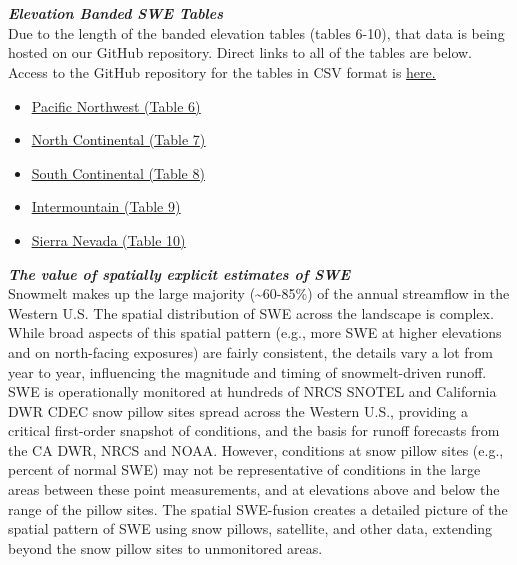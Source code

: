 \documentclass{article}
\begin{document}
\section*{}\label{sec:elev_band_swe}
\fontsize{12}{16}
\noindent\textbf{\textit{Elevation Banded SWE Tables}}\\
\fontsize{10}{14}
\noindent Due to the length of the banded elevation tables (tables 6-10), that data is being hosted on our GitHub repository. Direct links to all of the tables are below. Access to the GitHub repository for the tables in CSV format is \href{https://github.com/CU-Mountain-Hydrology/WestWide}{\underline{here.}}
\begin{itemize}
    \item \href{https://github.com/CU-Mountain-Hydrology/WestWide/blob/main/WY_2026/PNW_{{ date }}_table06.csv}{\underline{Pacific Northwest (Table 6)}}
    \item \href{https://github.com/CU-Mountain-Hydrology/WestWide/blob/main/WY_2026/NOCN_{{ date }}_table07.csv}{\underline{North Continental (Table 7)}}
    \item \href{https://github.com/CU-Mountain-Hydrology/WestWide/blob/main/WY_2026/SOCN_{{ date }}_table08.csv}{\underline{South Continental (Table 8)}}
    \item \href{https://github.com/CU-Mountain-Hydrology/WestWide/blob/main/WY_2026/INMT_{{ date }}_table09.csv}{\underline{Intermountain (Table 9)}}
    \item \href{https://github.com/CU-Mountain-Hydrology/WestWide/blob/main/WY_2026/SNM_{{ date }}_table10.csv}{\underline{Sierra Nevada (Table 10)}}
\end{itemize}

\fontsize{12}{16}
\noindent\textbf{\textit{The value of spatially explicit estimates of SWE}}\\
\fontsize{10}{14}
\noindent Snowmelt makes up the large majority (\textasciitilde60-85\%) of the annual streamflow in the Western U.S. The spatial distribution of SWE across the landscape is complex. While broad aspects of this spatial pattern (e.g., more SWE at higher elevations and on north-facing exposures) are fairly consistent, the details vary a lot from year to year, influencing the magnitude and timing of snowmelt-driven runoff.\\

\noindent SWE is operationally monitored at hundreds of NRCS SNOTEL and California DWR CDEC snow pillow sites spread across the Western U.S., providing a critical first-order snapshot of conditions, and the basis for runoff forecasts from the CA DWR, NRCS and NOAA. However, conditions at snow pillow sites (e.g., percent of normal SWE) may not be representative of conditions in the large areas between these point measurements, and at elevations above and below the range of the pillow sites. The spatial SWE-fusion creates a detailed picture of the spatial pattern of SWE using snow pillows, satellite, and other data, extending beyond the snow pillow sites to unmonitored areas.\\
\end{document}
